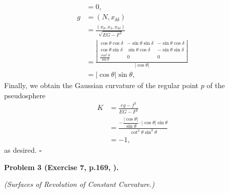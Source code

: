 \documentclass[a4paper]{article}
\numberwithin{equation}{section}
\begin{document}
\begin{enumerate}
\begin{align}
&= 0,\\
g& = \left( {N,{x_{\delta \delta }}} \right)\\
& = \frac{{\left( {{x_\theta },{x_\delta },{x_{\delta \delta }}} \right)}}{{\sqrt {EG - {F^2}} }}\\
& = \frac{{\left| {\begin{array}{*{20}{c}}
{\cos \theta \cos \delta }&{ - \sin \theta \sin \delta }&{ - \sin \theta \cos \delta }\\
{\cos \theta \sin \delta }&{\sin \theta \cos \delta }&{ - \sin \theta \sin \delta }\\
{\frac{{{{\cos }^2}\theta }}{{\sin \theta }}}&0&0
\end{array}} \right|}}{{\left| {\cos \theta } \right|}}\\
& = \left| {\cos \theta } \right|\sin \theta ,
\end{align}
Finally, we obtain the Gaussian curvature of the regular point $p$ of the pseudosphere 
\begin{align}
K &= \frac{{eg - {f^2}}}{{EG - {F^2}}}\\
 &= \frac{{ - \dfrac{{\left| {\cos \theta } \right|}}{{\sin \theta }} \cdot \left| {\cos \theta } \right|\sin \theta }}{{{{\cot }^2}\theta {{\sin }^2}\theta }}\\
 &=  - 1,
\end{align}
as desired. \hfill $\square$
\end{enumerate}
\vspace{0.5cm}
\textbf{Problem 3 (Exercise 7, p.169, \cite{1}).}

\textit{(Surfaces of Revolution of Constant Curvature.)} 
\end{document}
